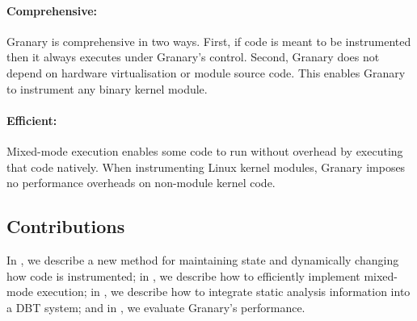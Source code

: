 \documentclass{sigplanconf}
\begin{document}

%

\paragraph{Comprehensive:} Granary is comprehensive in two ways. First, if code is meant to be instrumented then it always executes under Granary's control. Second, Granary does not depend on hardware virtualisation or module source code. This enables Granary to instrument any binary kernel module.

\paragraph{Efficient:} Mixed-mode execution enables some code to run without overhead by executing that code natively. When instrumenting Linux kernel modules, Granary imposes no performance overheads on non-module kernel code.


\subsection{Contributions}\label{sec:contrib}
In , we describe a new method for maintaining state and dynamically changing how code is instrumented; in , we describe how to efficiently implement mixed-mode execution; in , we describe how to integrate static analysis information into a DBT system; and in , we evaluate Granary's performance.
\end{document}
